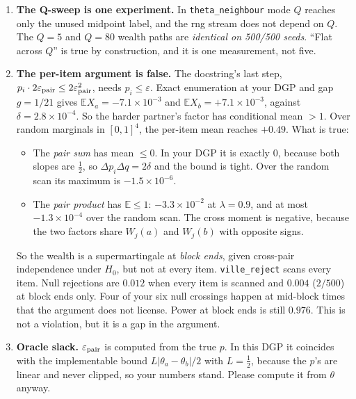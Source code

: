 \documentclass[11pt]{article}
\begin{document}
\begin{enumerate}[nosep]
\item \textbf{The Q-sweep is one experiment.} In \texttt{theta\_neighbour} mode $Q$ reaches only the unused midpoint label, and the rng stream does not depend on $Q$. The $Q=5$ and $Q=80$ wealth paths are \emph{identical on 500/500 seeds}. ``Flat across $Q$'' is true by construction, and it is one measurement, not five.
\item \textbf{The per-item argument is false.} The docstring's last step, $p_i\cdot2\varepsilon_{\rm pair}\le2\varepsilon_{\rm pair}^2$, needs $p_i\le\varepsilon$. Exact enumeration at your DGP and gap $g=1/21$ gives $\mathbb E X_a=-7.1\times10^{-3}$ and $\mathbb E X_b=+7.1\times10^{-3}$, against $\delta=2.8\times10^{-4}$. So the harder partner's factor has conditional mean $>1$. Over random marginals in $[0,1]^4$, the per-item mean reaches $+0.49$. What is true:
\begin{itemize}[nosep]
\item The \emph{pair sum} has mean $\le0$. In your DGP it is exactly $0$, because both slopes are $\tfrac12$, so $\Delta p_i\Delta q=2\delta$ and the bound is tight. Over the random scan its maximum is $-1.5\times10^{-6}$.
\item The \emph{pair product} has $\mathbb E\le1$: $-3.3\times10^{-2}$ at $\lambda=0.9$, and at most $-1.3\times10^{-4}$ over the random scan. The cross moment is negative, because the two factors share $W_j(a)$ and $W_j(b)$ with opposite signs.
\end{itemize}
So the wealth is a supermartingale at \emph{block ends}, given cross-pair independence under $H_0$, but not at every item. \texttt{ville\_reject} scans every item. Null rejections are $0.012$ when every item is scanned and $0.004$ ($2/500$) at block ends only. Four of your six null crossings happen at mid-block times that the argument does not license. Power at block ends is still $0.976$. This is not a violation, but it is a gap in the argument.
\item \textbf{Oracle slack.} $\varepsilon_{\rm pair}$ is computed from the true $p$. In this DGP it coincides with the implementable bound $L|\theta_a-\theta_b|/2$ with $L=\tfrac12$, because the $p$'s are linear and never clipped, so your numbers stand. Please compute it from $\theta$ anyway.
\end{enumerate}
\end{document}
